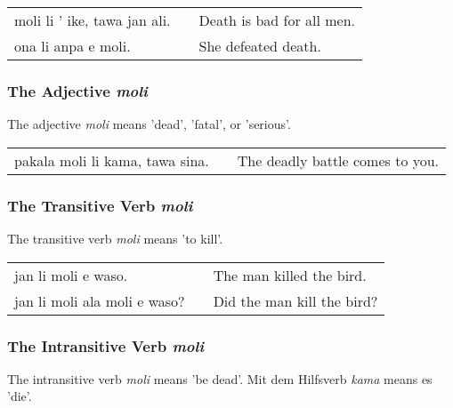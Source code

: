 \begin{supertabular}{p{5,5cm}|ll}
    moli li ' ike, tawa jan ali. &  & Death is bad for all men. \\
    ona li anpa e moli.          &  & She defeated death.       \\
\end{supertabular}

%
%
\subsubsection*{The Adjective \textit{moli}}
%
%

The adjective \textit{moli} means 'dead', 'fatal', or 'serious'.

\begin{supertabular}{p{5,5cm}|ll}
    pakala moli li kama, tawa sina. &  & The deadly battle comes to you. \\
\end{supertabular}

%
%
\subsubsection*{The Transitive Verb \textit{moli}}
%
%
The transitive verb \textit{moli} means 'to kill'.

\begin{supertabular}{p{5,5cm}|ll}
    jan li moli e waso.          &  & The man killed the bird.   \\
    jan li moli ala moli e waso? &  & Did the man kill the bird? \\
\end{supertabular}

%
%
\subsubsection*{The Intransitive Verb \textit{moli}}
%
%

The intransitive verb \textit{moli} means 'be dead'.
Mit dem Hilfsverb \textit{kama} means es 'die'.

